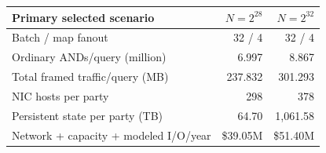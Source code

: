 \begin{center}\small
\begin{tabular}{lrr}\toprule
Primary selected scenario & $N=2^{28}$ & $N=2^{32}$\\\midrule
Batch / map fanout & 32 / 4 & 32 / 4\\
Ordinary ANDs/query (million) & 6.997 & 8.867\\
Total framed traffic/query (MB) & 237.832 & 301.293\\
NIC hosts per party & 298 & 378\\
Persistent state per party (TB) & 64.70 & 1,061.58\\
Network + capacity + modeled I/O/year & \$39.05M & \$51.40M\\
\bottomrule\end{tabular}
\end{center}
